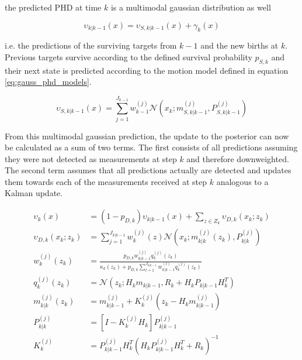 the predicted PHD at time $k$ is a multimodal gaussian distribution as well

\begin{equation}
    \upsilon_{k|k-1}(x) = \upsilon_{S,k|k-1}(x) + \gamma_k(x)    
\end{equation}

i.e. the predictions of the surviving targets from $k-1$ and the new births at $k$. Previous targets survive according to the defined survival probability $p_{S,k}$ and their next state is predicted according to the motion model defined in equation \eqref{eq:gauss_phd_models}.

\begin{equation}
    \upsilon_{S,k|k-1}(x) = \sum\limits_{j=1}^{J_{k-1}} w^{(j)}_{k-1} \mathcal{N}(x_k; m^{(j)}_{S,k|k-1},P^{(j)}_{S,k|k-1})   
\end{equation}

From this multimodal gaussian prediction, the update to the posterior can now be calculated as a sum of two terms. The first consists of all predictions assuming they were not detected as measurements at step $k$ and therefore downweighted. The second term assumes that all predictions actually are detected and updates them towards each of the measurements received at step $k$ analogous to a Kalman update.\cite{clark2006gm}

\begin{equation}
    \begin{split}
        \upsilon_k(x) &= (1-p_{D,k}) \upsilon_{k|k-1}(x) + \sum\limits_{z \in Z_k} \upsilon_{D,k}(x_k;z_k) \\
        \upsilon_{D,k}(x_k;z_k) &= \sum\limits_{j=1}^{J_{k|k-1}}w_k^{(j)}(z) \mathcal{N}(x_k; m^{(j)}_{k|k}(z_k),P^{(j)}_{k|k})\\
        w_k^{(j)}(z_k) &= \frac{p_{D,k}w^{(j)}_{k|k-1}q_k^{(j)}(z_k)} {\kappa_k(z_k)+p_{D,k}\sum\limits_{l=1}^{J_{k|k-1}}w^{(l)}_{k|k-1}q_k^{(l)}(z_k)}\\
        q_k^{(j)}(z_k) &= \mathcal{N}(z_k; H_{k}m_{k|k-1},R_{k}+H_{k}P_{k|k-1}H_{k}^T)\\
        m^{(j)}_{k|k}(z_k) &= m^{(j)}_{k|k-1} + K_k^{(j)}(z_k - H_k m^{(j)}_{k|k-1})\\
        P^{(j)}_{k|k} &= [I - K_k^{(j)}H_k]P^{(j)}_{k|k-1}\\
        K_k^{(j)} &= P^{(j)}_{k|k-1}H_k^T (H_k P^{(j)}_{k|k-1} H_k^T + R_k)^{-1}
    \end{split}
\end{equation}

